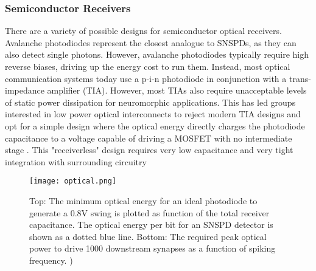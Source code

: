 \documentclass[twocolumn]{article}
\begin{document}
\subsubsection{Semiconductor Receivers}
\quad \quad There are a variety of possible designs for semiconductor optical receivers. Avalanche photodiodes represent the closest analogue to SNSPDs, as they can also detect single photons. However, avalanche photodiodes typically require high reverse biases, driving up the energy cost to run them. Instead, most optical communication systems today use a p-i-n photodiode in conjunction with a trans-impedance amplifier (TIA). However, most TIAs also require unacceptable levels of static power dissipation for neuromorphic applications. This has led groups interested in low power optical interconnects to reject modern TIA designs and opt for a simple design where the optical energy directly charges the photodiode capacitance to a voltage capable of driving a MOSFET with no intermediate stage \cite{miller2017attojoule}. This "receiverless" design requires very low capacitance and very tight integration with surrounding circuitry 

\begin{figure}[H]
    \centering
    \texttt{[image: optical.png]}
    \caption{Top: The minimum optical energy for an ideal photodiode to generate a 0.8V swing is plotted as function of the total receiver capacitance. The optical energy per bit for an SNSPD detector is shown as a dotted blue line. Bottom: The required peak optical power to drive 1000 downstream synapses as a function of spiking frequency. )}
    \label{fig:my_label}
\end{figure}
\end{document}
